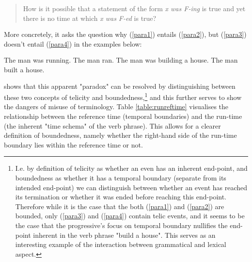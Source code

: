 \begin{quotation}
    How is it possible that a statement of the form \emph{x was F-ing} is true and yet there
    is no time at which \emph{x was F-ed} is true?
\end{quotation}
More concretely, it asks the question why (\ref{para1}) entails (\ref{para2}), but (\ref{para3}) doesn't entail (\ref{para4}) in the examples below:
\begin{exe}
    \ex The man was running.
    \label{para1}
    \ex The man ran.
    \label{para2}
    \ex The man was building a house.
    \label{para3}
    \ex The man built a house.
    \label{para4}
\end{exe}
\citet{6608d9d0-a477-39af-8491-2172df5ae612} shows that this apparent "paradox" can be resolved by distinguishing between these two concepts of telicity and boundedness,\footnote{I.e. by definition of telicity as whether an even has an inherent end-point, and boundedness as whether it has a temporal boundary (separate from its intended end-point) we can distinguish between whether an event has reached its termination or whether it was ended before reaching this end-point. Therefore while it is the case that the both (\ref{para1}) and (\ref{para2}) are bounded, only (\ref{para3}) and (\ref{para4}) contain telic events, and it seems to be the case that the progressive's focus on temporal boundary nullifies the end-point inherent in the verb phrase "build a house". This serves as an interesting example of the interaction between grammatical and lexical aspect.} and this further serves to show the dangers of misuse of terminology. Table \ref{table:runreftime} visualises the relationship between the reference time (temporal boundaries) and the run-time (the inherent "time schema" of the verb phrase). This allows for a clearer definition of boundedness, namely whether the right-hand side of the run-time boundary lies within the reference time or not.



